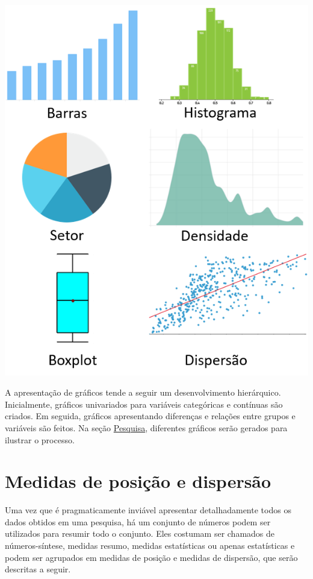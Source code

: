 \documentclass[
]{book}
\begin{document}
\includegraphics{./img/cap_graficos.png}

A apresentação de gráficos tende a seguir um desenvolvimento
hierárquico. Inicialmente, gráficos univariados para variáveis
categóricas e contínuas são criados. Em seguida, gráficos apresentando
diferenças e relações entre grupos e variáveis são feitos. Na seção
\protect\hyperlink{pesquisa}{Pesquisa}, diferentes gráficos serão
gerados para ilustrar o processo.

\hypertarget{medidas-de-posiuxe7uxe3o-e-dispersuxe3o}{%
\section{Medidas de posição e
dispersão}\label{medidas-de-posiuxe7uxe3o-e-dispersuxe3o}}

Uma vez que é pragmaticamente inviável apresentar detalhadamente todos
os dados obtidos em uma pesquisa, há um conjunto de números podem ser
utilizados para resumir todo o conjunto. Eles costumam ser chamados de
números-síntese, medidas resumo, medidas estatísticas ou apenas
estatísticas e podem ser agrupados em medidas de posição e medidas de
dispersão, que serão descritas a seguir.
\end{document}
